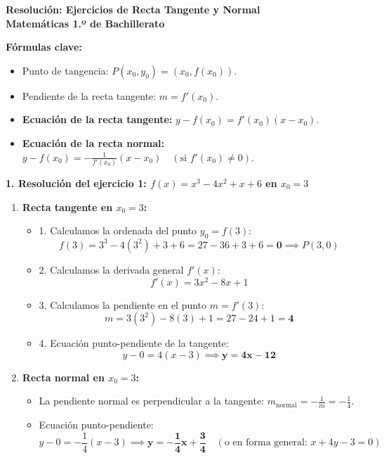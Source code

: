 ﻿\documentclass[11pt,a4paper]{article}
\begin{document}
\pagestyle{empty}

\begin{center}
    {\LARGE \textbf{Resolución: Ejercicios de Recta Tangente y Normal}}\\[4pt]
    {\large \textbf{Matemáticas 1.º de Bachillerato}}
\end{center}

\vspace{0.3cm}
\noindent\textbf{Fórmulas clave:}
\begin{itemize}[leftmargin=1.5em, itemsep=2pt]
    \item Punto de tangencia: $P(x_0, y_0) = (x_0, f(x_0))$.
    \item Pendiente de la recta tangente: $m = f'(x_0)$.
    \item \textbf{Ecuación de la recta tangente:} $y - f(x_0) = f'(x_0)(x - x_0)$.
    \item \textbf{Ecuación de la recta normal:} $y - f(x_0) = -\frac{1}{f'(x_0)}(x - x_0) \quad (\text{si } f'(x_0) \neq 0)$.
\end{itemize}

\vspace{0.3cm}
\noindent\textbf{1. Resolución del ejercicio 1: $f(x) = x^3 - 4x^2 + x + 6$ en $x_0 = 3$}

\begin{enumerate}[label=\textbf{\alph*)}, leftmargin=2em, itemsep=6pt]
    \item \textbf{Recta tangente en $x_0 = 3$:}
    \begin{itemize}[leftmargin=1.5em, itemsep=2pt]
        \item 1. Calculamos la ordenada del punto $y_0 = f(3)$:
        \[
        f(3) = 3^3 - 4(3^2) + 3 + 6 = 27 - 36 + 3 + 6 = \mathbf{0} \implies P(3, 0)
        \]
        \item 2. Calculamos la derivada general $f'(x)$:
        \[
        f'(x) = 3x^2 - 8x + 1
        \]
        \item 3. Calculamos la pendiente en el punto $m = f'(3)$:
        \[
        m = 3(3^2) - 8(3) + 1 = 27 - 24 + 1 = \mathbf{4}
        \]
        \item 4. Ecuación punto-pendiente de la tangente:
        \[
        y - 0 = 4(x - 3) \implies \mathbf{y = 4x - 12}
        \]
    \end{itemize}

    \item \textbf{Recta normal en $x_0 = 3$:}
    \begin{itemize}[leftmargin=1.5em, itemsep=2pt]
        \item La pendiente normal es perpendicular a la tangente: $m_{\text{normal}} = -\frac{1}{m} = -\frac{1}{4}$.
        \item Ecuación punto-pendiente:
        \[
        y - 0 = -\frac{1}{4}(x - 3) \implies \mathbf{y = -\frac{1}{4}x + \frac{3}{4}} \quad (\text{o en forma general: } x + 4y - 3 = 0)
        \]
    \end{itemize}
\end{enumerate}
\end{document}
